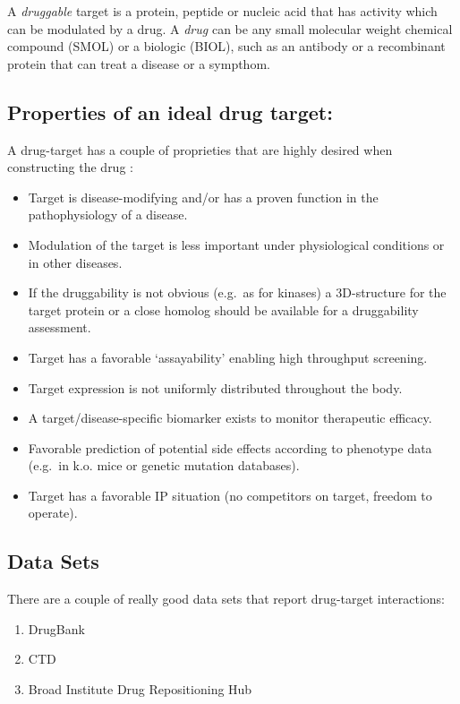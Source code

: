 \documentclass[
]{book}
\begin{document}
A \emph{druggable} target is a protein, peptide or nucleic acid that has activity which can be modulated by a drug. A \emph{drug} can be any small molecular weight chemical compound (SMOL) or a biologic (BIOL), such as an antibody or a recombinant protein that can treat a disease or a sympthom.

\hypertarget{properties-of-an-ideal-drug-target}{%
\subsection{Properties of an ideal drug target:}\label{properties-of-an-ideal-drug-target}}

A drug-target has a couple of proprieties that are highly desired when constructing the drug \citep{Gashaw2011}:

\begin{itemize}
\item
  Target is disease-modifying and/or has a proven function in the pathophysiology of a disease.
\item
  Modulation of the target is less important under physiological conditions or in other diseases.
\item
  If the druggability is not obvious (e.g.~as for kinases) a 3D-structure for the target protein or a close homolog should be available for a druggability assessment.
\item
  Target has a favorable `assayability' enabling high throughput screening.
\item
  Target expression is not uniformly distributed throughout the body.
\item
  A target/disease-specific biomarker exists to monitor therapeutic efficacy.
\item
  Favorable prediction of potential side effects according to phenotype data (e.g.~in k.o. mice or genetic mutation databases).
\item
  Target has a favorable IP situation (no competitors on target, freedom to operate).
\end{itemize}

\hypertarget{data-sets-2}{%
\subsection{Data Sets}\label{data-sets-2}}

There are a couple of really good data sets that report drug-target interactions:

\begin{enumerate}
\def\labelenumi{\arabic{enumi}.}
\item
  DrugBank \citep{Wishart2006, wishart2017}
\item
  CTD \citep{davis2020}
\item
  Broad Institute Drug Repositioning Hub \citep{corsello2017}
\end{enumerate}
\end{document}
